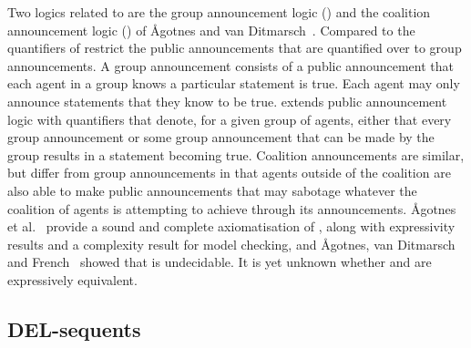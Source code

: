 Two logics related to \logicApal{} are the group announcement logic (\logicGal{}) and the coalition announcement logic (\logicCal{}) of {\AA}gotnes and van Ditmarsch~\cite{agotnes:2008,agotnes:2010}. 
Compared to \logicApal{} the quantifiers of \logicGal{} restrict the public announcements that are quantified over to group announcements.
A group announcement consists of a public announcement that each agent in a group knows a particular statement is true.
Each agent may only announce statements that they know to be true.
\logicGal{} extends public announcement logic with quantifiers that denote, for a given group of agents, either that every group announcement or some group announcement that can be made by the group results in a statement becoming true.
Coalition announcements are similar, but differ from group announcements in that agents outside of the coalition are also able to make public announcements that may sabotage whatever the coalition of agents is attempting to achieve through its announcements.
{\AA}gotnes et al.~\cite{agotnes:2010} provide a sound and complete axiomatisation of \logicGal{}, along with expressivity results and a complexity result for model checking, and {\AA}gotnes, van Ditmarsch and French~\cite{agotnes:2014} showed that \logicGal{} is undecidable.
It is yet unknown whether \logicGal{} and \logicCal{} are expressively equivalent.


\subsection{DEL-sequents}

